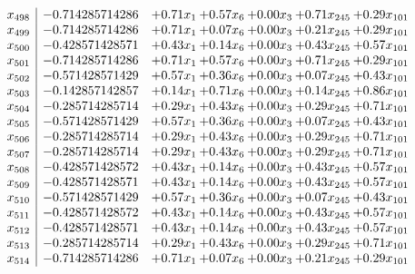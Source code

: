 \documentclass[8pt]{article}
\begin{document}
\[\begin{array}{c| c c@{\hskip 2pt} c@{\hskip 2pt} c@{\hskip 2pt} c@{\hskip 2pt} c@{\hskip 2pt} }
 x_{498}   &  -0.714285714286 & +  0.71 x_{1} & +  0.57 x_{6} & +  0.00 x_{3} & +  0.71 x_{245} & +  0.29 x_{101}\\
 x_{499}   &  -0.714285714286 & +  0.71 x_{1} & +  0.07 x_{6} & +  0.00 x_{3} & +  0.21 x_{245} & +  0.29 x_{101}\\
 x_{500}   &  -0.428571428571 & +  0.43 x_{1} & +  0.14 x_{6} & +  0.00 x_{3} & +  0.43 x_{245} & +  0.57 x_{101}\\
 x_{501}   &  -0.714285714286 & +  0.71 x_{1} & +  0.57 x_{6} & +  0.00 x_{3} & +  0.71 x_{245} & +  0.29 x_{101}\\
 x_{502}   &  -0.571428571429 & +  0.57 x_{1} & +  0.36 x_{6} & +  0.00 x_{3} & +  0.07 x_{245} & +  0.43 x_{101}\\
 x_{503}   &  -0.142857142857 & +  0.14 x_{1} & +  0.71 x_{6} & +  0.00 x_{3} & +  0.14 x_{245} & +  0.86 x_{101}\\
 x_{504}   &  -0.285714285714 & +  0.29 x_{1} & +  0.43 x_{6} & +  0.00 x_{3} & +  0.29 x_{245} & +  0.71 x_{101}\\
 x_{505}   &  -0.571428571429 & +  0.57 x_{1} & +  0.36 x_{6} & +  0.00 x_{3} & +  0.07 x_{245} & +  0.43 x_{101}\\
 x_{506}   &  -0.285714285714 & +  0.29 x_{1} & +  0.43 x_{6} & +  0.00 x_{3} & +  0.29 x_{245} & +  0.71 x_{101}\\
 x_{507}   &  -0.285714285714 & +  0.29 x_{1} & +  0.43 x_{6} & +  0.00 x_{3} & +  0.29 x_{245} & +  0.71 x_{101}\\
 x_{508}   &  -0.428571428572 & +  0.43 x_{1} & +  0.14 x_{6} & +  0.00 x_{3} & +  0.43 x_{245} & +  0.57 x_{101}\\
 x_{509}   &  -0.428571428571 & +  0.43 x_{1} & +  0.14 x_{6} & +  0.00 x_{3} & +  0.43 x_{245} & +  0.57 x_{101}\\
 x_{510}   &  -0.571428571429 & +  0.57 x_{1} & +  0.36 x_{6} & +  0.00 x_{3} & +  0.07 x_{245} & +  0.43 x_{101}\\
 x_{511}   &  -0.428571428572 & +  0.43 x_{1} & +  0.14 x_{6} & +  0.00 x_{3} & +  0.43 x_{245} & +  0.57 x_{101}\\
 x_{512}   &  -0.428571428571 & +  0.43 x_{1} & +  0.14 x_{6} & +  0.00 x_{3} & +  0.43 x_{245} & +  0.57 x_{101}\\
 x_{513}   &  -0.285714285714 & +  0.29 x_{1} & +  0.43 x_{6} & +  0.00 x_{3} & +  0.29 x_{245} & +  0.71 x_{101}\\
 x_{514}   &  -0.714285714286 & +  0.71 x_{1} & +  0.07 x_{6} & +  0.00 x_{3} & +  0.21 x_{245} & +  0.29 x_{101}\\

\end{array}\]
\end{document}

